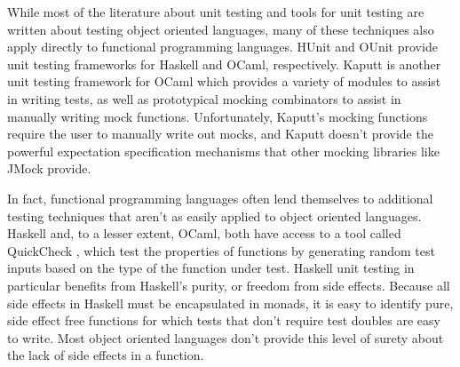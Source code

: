 \documentclass[proposal]{softeng}
\begin{document}


While most of the literature about unit testing and tools for unit
testing are written about testing object oriented languages, many of
these techniques also apply directly to functional programming
languages. HUnit \cite{www:hunit} and OUnit \cite{www:ounit} provide
unit testing frameworks for Haskell and OCaml, respectively. Kaputt
\cite{www:kaputt} is another unit testing framework for OCaml which
provides a variety of modules to assist in writing tests, as well as
prototypical mocking combinators to assist in manually writing mock
functions. Unfortunately, Kaputt's mocking functions require the user
to manually write out mocks, and Kaputt doesn't provide the powerful
expectation specification mechanisms that other mocking libraries like
JMock \cite{www:jmock} provide.

In fact, functional programming languages often lend themselves to
additional testing techniques that aren't as easily applied to object
oriented languages. Haskell and, to a lesser extent, OCaml, both have
access to a tool called QuickCheck \cite{canou:ocaml_random_test}
\cite{claessen:quickcheck}, which test the properties of functions by
generating random test inputs based on the type of the function under
test. Haskell unit testing in particular benefits from Haskell's
purity, or freedom from side effects. Because all side effects in
Haskell must be encapsulated in monads, it is easy to identify pure,
side effect free functions for which tests that don't require test
doubles are easy to write. Most object oriented languages don't
provide this level of surety about the lack of side effects in a
function.

\end{document}

